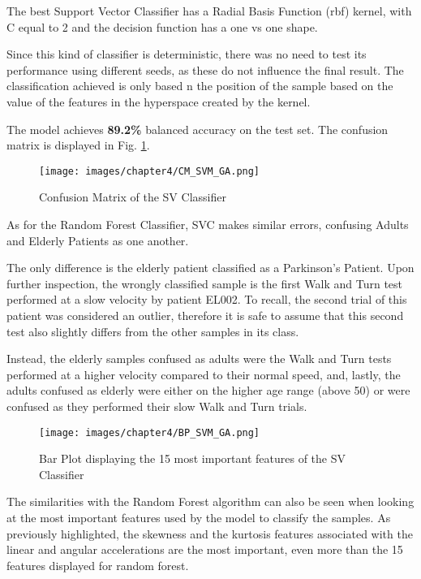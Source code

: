 The best Support Vector Classifier has a Radial Basis Function (rbf) kernel, with C equal to 2 and the decision function has a one vs one shape.

Since this kind of classifier is deterministic, there was no need to test its performance using different seeds, as these do not influence the final result. The classification achieved is only based n the position of the sample based on the value of the features in the hyperspace created by the kernel.


The model achieves \textbf{89.2\%} balanced accuracy on the test set. The confusion matrix is displayed in Fig. \ref{fig:CM_SVM_GA}.

\begin{figure}[h!]
    \centering
    \texttt{[image: images/chapter4/CM\_SVM\_GA.png]}
    \caption{Confusion Matrix of the SV Classifier}
    \label{fig:CM_SVM_GA}
\end{figure}

As for the Random Forest Classifier, SVC makes similar errors, confusing Adults and Elderly Patients as one another. 

The only difference is the elderly patient classified as a Parkinson's Patient. Upon further inspection, the wrongly classified sample is the first Walk and Turn test performed at a slow velocity by patient EL002. To recall, the second trial of this patient was considered an outlier, therefore it is safe to assume that this second test also slightly differs from the other samples in its class.


Instead, the elderly samples confused as adults were the Walk and Turn tests performed at a higher velocity compared to their normal speed, and, lastly, the adults confused as elderly were either on the higher age range (above 50) or were confused as they performed their slow Walk and Turn trials.

\begin{figure}[h!]
    \centering
    \texttt{[image: images/chapter4/BP\_SVM\_GA.png]}
    \caption{Bar Plot displaying the 15 most important features of the SV Classifier}
    \label{fig:BP_SVM_GA}
\end{figure}

The similarities with the Random Forest algorithm can also be seen when looking at the most important features used by the model to classify the samples. As previously highlighted, the skewness and the kurtosis features associated with the linear and angular accelerations are the most important, even more than the 15 features displayed for random forest.
